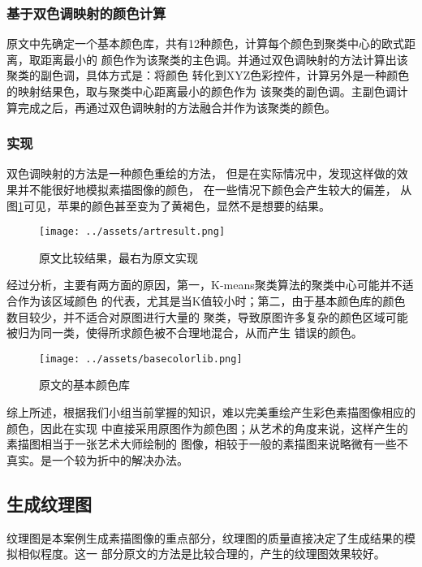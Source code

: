 \documentclass[UTF8, twocolumn]{ctexart}
\begin{document}
      \subsubsection{基于双色调映射的颜色计算}
      原文中先确定一个基本颜色库，共有12种颜色，计算每个颜色到聚类中心的欧式距离，取距离最小的
      颜色作为该聚类的主色调。并通过双色调映射的方法计算出该聚类的副色调，具体方式是：将颜色
      转化到XYZ色彩控件，计算另外是一种颜色的映射结果色，取与聚类中心距离最小的颜色作为
      该聚类的副色调。主副色调计算完成之后，再通过双色调映射的方法融合并作为该聚类的颜色。

      \subsubsection{实现}
      双色调映射的方法是一种颜色重绘的方法，
      但是在实际情况中，发现这样做的效果并不能很好地模拟素描图像的颜色，
      在一些情况下颜色会产生较大的偏差，
      从图\ref{fig:artresult}可见，苹果的颜色甚至变为了黄褐色，显然不是想要的结果。
      \begin{figure}[htbp]
        \begin{center}
          \texttt{[image: ../assets/artresult.png]}
          \caption{原文比较结果，最右为原文实现}
          \label{fig:artresult}
        \end{center}
      \end{figure}
      \par
      经过分析，主要有两方面的原因，第一，K-means聚类算法的聚类中心可能并不适合作为该区域颜色
      的代表，尤其是当K值较小时；第二，由于基本颜色库的颜色数目较少，并不适合对原图进行大量的
      聚类，导致原图许多复杂的颜色区域可能被归为同一类，使得所求颜色被不合理地混合，从而产生
      错误的颜色。
      \begin{figure}[htbp]
        \begin{center}
          \texttt{[image: ../assets/basecolorlib.png]}
          \caption{原文的基本颜色库}
          \label{fig:basecolorlib}
        \end{center}
      \end{figure}
      综上所述，根据我们小组当前掌握的知识，难以完美重绘产生彩色素描图像相应的颜色，因此在实现
      中直接采用原图作为颜色图；从艺术的角度来说，这样产生的素描图相当于一张艺术大师绘制的
      图像，相较于一般的素描图来说略微有一些不真实。是一个较为折中的解决办法。

    \subsection{生成纹理图}
      纹理图是本案例生成素描图像的重点部分，纹理图的质量直接决定了生成结果的模拟相似程度。这一
      部分原文的方法是比较合理的，产生的纹理图效果较好。
\end{document}

